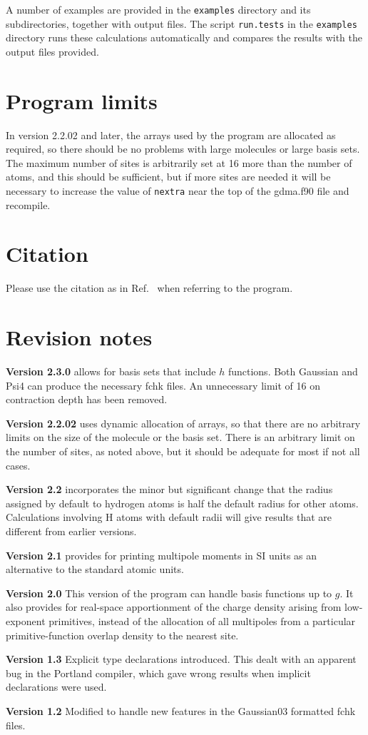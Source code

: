 \documentclass[12pt,txfonts]{paper}
\begin{document}
A number of examples are provided in the \verb/examples/ directory and
its subdirectories, together with output files. The script
\verb/run.tests/ in the \verb/examples/ directory runs these
calculations automatically and compares the results with the output
files provided. 

\section{Program limits}

In version 2.2.02 and later, the arrays used by the program are allocated as
required, so there should be no problems with large molecules or large
basis sets. The maximum number of sites is arbitrarily set at 16 more
than the number of atoms, and this should be sufficient, but if more
sites are needed it will be necessary to increase the value of
\texttt{nextra} near the top of the gdma.f90 file and recompile.


\section{Citation}

Please use the citation as in Ref.~ when referring
to the program.


\section{Revision notes}

\textbf{Version 2.3.0} allows for basis sets that include $h$
functions. Both Gaussian and Psi4 can produce the necessary fchk
files. An unnecessary limit of 16 on contraction depth has been
removed.

\textbf{Version 2.2.02} uses dynamic allocation of arrays, so that
there are no arbitrary limits on the size of the molecule or the basis
set. There is an arbitrary limit on the number of sites, as noted
above, but it should be adequate for most if not all cases.

\textbf{Version 2.2} incorporates the minor but significant change
that the radius assigned by default to hydrogen atoms is half the default
radius for other atoms. Calculations involving H atoms with default
radii will give results that are different from earlier versions.

\textbf{Version 2.1} provides for printing multipole moments in SI
units as an alternative to the standard atomic units.

\textbf{Version 2.0} This version of the program can handle basis
functions up to $g$. It also provides for real-space apportionment
of the charge density arising from low-exponent primitives, instead
of the allocation of all multipoles from a particular
primitive-function overlap density to the nearest site.

\textbf{Version 1.3} Explicit type declarations introduced. This dealt
with an apparent bug in the Portland compiler, which gave wrong
results when implicit declarations were used.

\textbf{Version 1.2} Modified to handle new features in the Gaussian03
formatted fchk files.

\pagebreak

\end{document}
